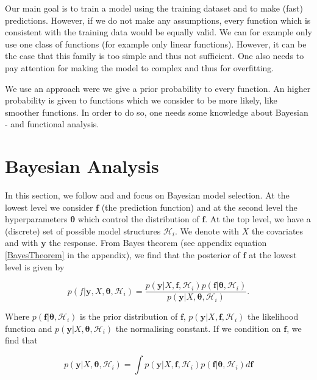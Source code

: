 \documentclass[12pt,a4paper,oneside]{book}
\begin{document}
Our main goal is to train a model using the training dataset and to make (fast) predictions. However, if we do not make any assumptions, every function which is consistent with the training data would be equally valid. We can for example only use one class of functions (for example only linear functions). However, it can be the case that this family is too simple and thus not sufficient. One also needs to pay attention for making the model to complex and thus for overfitting. 

We use an approach were we give a prior probability to every function. An higher probability is given to functions which we consider to be more likely, like smoother functions. In order to do so, one needs some knowledge about Bayesian - and functional analysis. 

\section{Bayesian Analysis}

In this section, we follow \cite{GPRbook} and \cite{camillagpr} and focus on Bayesian model selection. At the lowest level we consider $\bm{f}$ (the prediction function) and at the second level the hyperparameters $\bm{\theta}$ which control the distribution of $\bm{f}$. At the top level, we have a (discrete) set of possible model structures $\mathcal{H}_i$. We denote with $X$ the covariates and with $\bm{y}$ the response. From Bayes theorem (see appendix equation \ref{BayesTheorem} in the appendix), we find that the posterior of $\bm{f}$ at the lowest level is given by

\begin{equation}\label{Bayesian_analysis1}
p(f|\bm{y},X,\bm{\theta},\mathcal{H}_i) = \dfrac{p(\bm{y}|X,\bm{f},\mathcal{H}_i)p(\bm{f}|\bm{\theta},\mathcal{H}_i)}{p(\bm{y}|X,\bm{\theta},\mathcal{H}_i)}.
\end{equation}

Where $p(\bm{f}|\bm{\theta},\mathcal{H}_i)$ is the prior distribution of $\bm{f}$, $p(\bm{y}|X,\bm{f},\mathcal{H}_i)$ the likelihood function and $p(\bm{y}|X,\bm{\theta},\mathcal{H}_i)$ the normalising constant. If we condition on $\bm{f}$, we find that 

\begin{equation}\label{Bayesian_analysis2}
p(\bm{y}|X,\bm{\theta},\mathcal{H}_i) = \int p(\bm{y}|X,\bm{f},\mathcal{H}_i)p(\bm{f}|\bm{\theta},\mathcal{H}_i)d\bm{f}
\end{equation}
\end{document}
